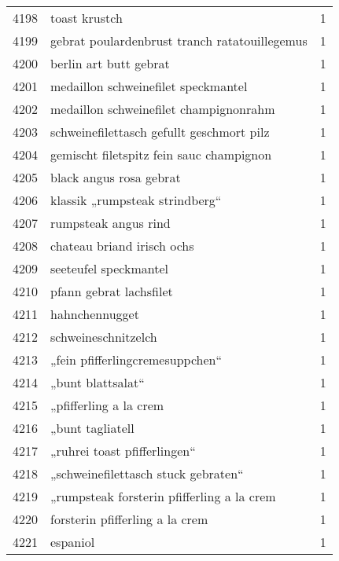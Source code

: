 \begin{tabular}{llr}
4198 &                                      toast krustch &      1 \\
4199 &      gebrat poulardenbrust tranch ratatouillegemus &      1 \\
4200 &                             berlin art butt gebrat &      1 \\
4201 &                medaillon schweinefilet speckmantel &      1 \\
4202 &             medaillon schweinefilet champignonrahm &      1 \\
4203 &          schweinefilettasch gefullt geschmort pilz &      1 \\
4204 &           gemischt filetspitz fein sauc champignon &      1 \\
4205 &                            black angus rosa gebrat &      1 \\
4206 &                     klassik „rumpsteak strindberg“ &      1 \\
4207 &                               rumpsteak angus rind &      1 \\
4208 &                         chateau briand irisch ochs &      1 \\
4209 &                              seeteufel speckmantel &      1 \\
4210 &                            pfann gebrat lachsfilet &      1 \\
4211 &                                     hahnchennugget &      1 \\
4212 &                                schweineschnitzelch &      1 \\
4213 &                    „fein pfifferlingcremesuppchen“ &      1 \\
4214 &                                  „bunt blattsalat“ &      1 \\
4215 &                             „pfifferling a la crem &      1 \\
4216 &                                   „bunt tagliatell &      1 \\
4217 &                       „ruhrei toast pfifferlingen“ &      1 \\
4218 &                „schweinefilettasch stuck gebraten“ &      1 \\
4219 &         „rumpsteak forsterin pfifferling a la crem &      1 \\
4220 &                    forsterin pfifferling a la crem &      1 \\
4221 &                                           espaniol &      1 \\

\end{tabular}
